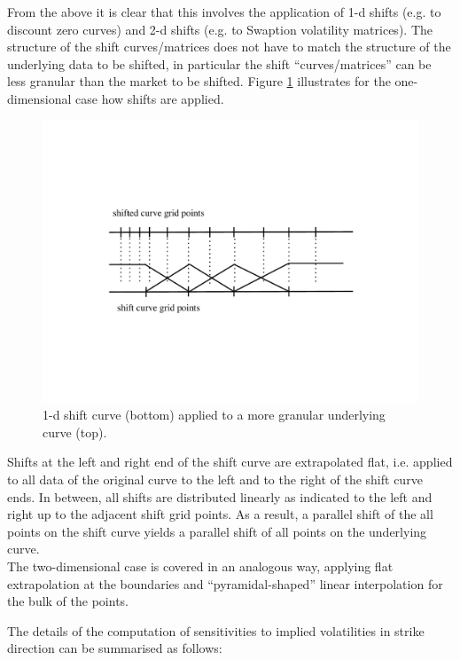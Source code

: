\documentclass[12pt, a4paper]{article}
\begin{document}
\begin{appendix}
From the above it is clear that this involves the application of 1-d shifts (e.g. to discount zero curves) and 2-d shifts (e.g. to Swaption volatility matrices). The structure of the shift curves/matrices does not have to match the structure of the underlying data to be shifted, in particular the shift ``curves/matrices'' can be less granular than the market to be shifted. 
Figure \ref{fig_shiftcurve} illustrates for the one-dimensional case how shifts are applied.
\begin{figure}[h]
\begin{center}
\includegraphics[scale=0.6]{shiftcurve.pdf}
\end{center}
\caption{1-d shift curve (bottom) applied to a more granular underlying curve (top). }
\label{fig_shiftcurve}
\end{figure} 

Shifts at the left and right end of the shift curve are extrapolated flat, i.e. applied to all data of the original curve to the left and to the right of the shift curve ends. In between, all shifts are distributed linearly as indicated to the left and right up to the adjacent shift grid points. As a result, a parallel shift of the all points on the shift curve yields a parallel shift of all points on the underlying curve.   \\

The two-dimensional case is covered in an analogous way, applying flat extrapolation at the boundaries and ``pyramidal-shaped'' linear interpolation for the bulk of the points. 

The details of the computation of sensitivities to implied volatilities in strike direction can be summarised as
follows:


\end{appendix}
\end{document}
